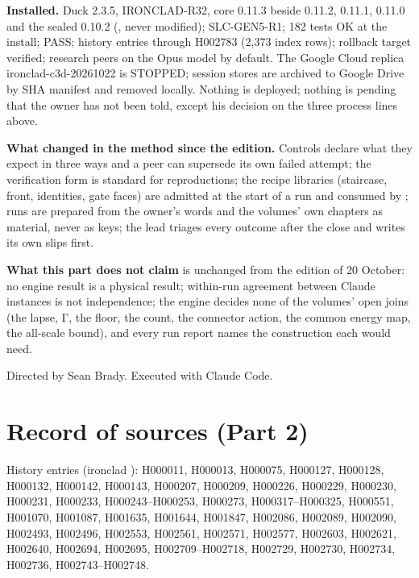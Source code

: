 \textbf{Installed.} Duck 2.3.5, IRONCLAD-R32, core 0.11.3 beside 0.11.2, 0.11.1, 0.11.0 and the sealed 0.10.2 (, never modified); SLC-GEN5-R1; 182 tests OK at the
install;  PASS; history entries through H002783 (2,373 index rows); rollback target  verified; research peers on the Opus model by default. The
Google Cloud replica ironclad-c3d-20261022 is STOPPED; session stores are archived to Google Drive by SHA manifest and removed locally. Nothing is deployed; nothing is
pending that the owner has not been told, except his decision on the three process lines above.

\textbf{What changed in the method since the edition.} Controls declare what they expect in three ways and a peer can supersede its own failed attempt; the verification
form is standard for reproductions; the recipe libraries (staircase, front, identities, gate faces) are admitted at the start of a run and consumed by ;
runs are prepared from the owner's words and the volumes' own chapters as material, never as keys; the lead triages every outcome after the close and writes its own
slips first.

\textbf{What this part does not claim} is unchanged from the edition of 20 October: no engine result is a physical result; within-run agreement between Claude instances is
not independence; the engine decides none of the volumes' open joins (the lapse, Γ, the floor, the count, the connector action, the common energy map, the all-scale
bound), and every run report names the construction each would need.

Directed by Sean Brady. Executed with Claude Code.

\section*{Record of sources (Part 2)}\label{record-of-sources-part-2}

History entries (ironclad ): H000011, H000013, H000075, H000127, H000128, H000132, H000142, H000143, H000207, H000209,
H000226, H000229, H000230, H000231, H000233, H000243--H000253, H000273, H000317--H000325, H000551, H001070, H001087, H001635, H001644, H001847,
H002086, H002089, H002090, H002493, H002496, H002553, H002561, H002571, H002577, H002603, H002621, H002640, H002694, H002695, H002709--H002718,
H002729, H002730, H002734, H002736, H002743--H002748.

